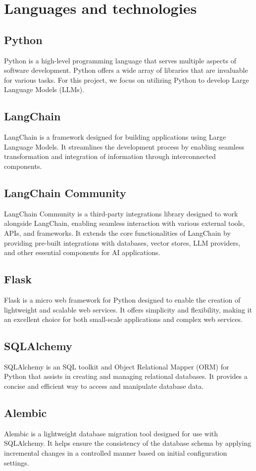 \section{Languages and technologies}
    \subsection{Python}
    Python is a high-level programming language that serves multiple aspects of software development. Python offers a wide array of libraries that are invaluable for various tasks. For this project, we focus on utilizing Python to develop Large Language Models (LLMs).
    \subsection{LangChain}
    LangChain is a framework designed for building applications using Large Language Models. It streamlines the development process by enabling seamless transformation and integration of information through interconnected components.
    \subsection{LangChain Community}
    LangChain Community is a third-party integrations library designed to work alongside LangChain, enabling seamless interaction with various external tools, APIs, and frameworks. It extends the core functionalities of LangChain by providing pre-built integrations with databases, vector stores, LLM providers, and other essential components for AI applications.
    \subsection{Flask}
    Flask is a micro web framework for Python designed to enable the creation of lightweight and scalable web services. It offers simplicity and flexibility, making it an excellent choice for both small-scale applications and complex web services.
    \subsection{SQLAlchemy}
    SQLAlchemy is an SQL toolkit and Object Relational Mapper (ORM) for Python that assists in creating and managing relational databases. It provides a concise and efficient way to access and manipulate database data.
    \subsection{Alembic}
    Alembic is a lightweight database migration tool designed for use with SQLAlchemy. It helps ensure the consistency of the database schema by applying incremental changes in a controlled manner based on initial configuration settings.
